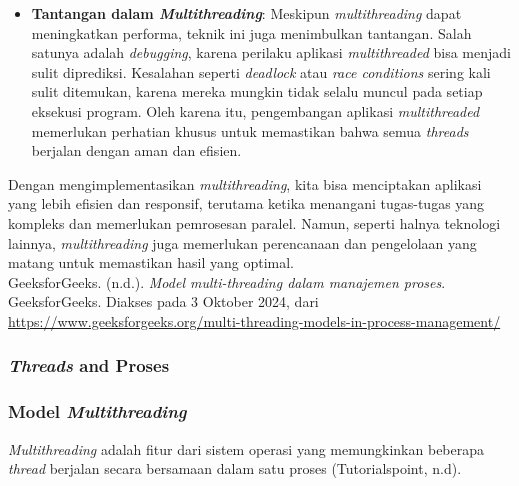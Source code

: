 \documentclass[12pt]{article}
\begin{document}
\begin{itemize}
    \item \textbf{Tantangan dalam \textit{Multithreading}}: Meskipun \textit{multithreading} dapat meningkatkan performa, teknik ini juga menimbulkan tantangan. Salah satunya adalah \textit{debugging}, karena perilaku aplikasi \textit{multithreaded} bisa menjadi sulit diprediksi. Kesalahan seperti \textit{deadlock} atau \textit{race conditions} sering kali sulit ditemukan, karena mereka mungkin tidak selalu muncul pada setiap eksekusi program. Oleh karena itu, pengembangan aplikasi \textit{multithreaded} memerlukan perhatian khusus untuk memastikan bahwa semua \textit{threads} berjalan dengan aman dan efisien.
\end{itemize}

Dengan mengimplementasikan \textit{multithreading}, kita bisa menciptakan aplikasi yang lebih efisien dan responsif, terutama ketika menangani tugas-tugas yang kompleks dan memerlukan pemrosesan paralel. Namun, seperti halnya teknologi lainnya, \textit{multithreading} juga memerlukan perencanaan dan pengelolaan yang matang untuk memastikan hasil yang optimal.\\

\noindent GeeksforGeeks. (n.d.). \textit{Model multi-threading dalam manajemen proses}. GeeksforGeeks. Diakses pada 3 Oktober 2024, dari \url{https://www.geeksforgeeks.org/multi-threading-models-in-process-management/}

\subsubsection{\textit{Threads} and Proses}
\subsubsection{Model \textit{Multithreading}}
\textit{Multithreading} adalah fitur dari sistem operasi yang memungkinkan beberapa \textit{thread} berjalan secara bersamaan dalam satu proses (Tutorialspoint, n.d).\\
\end{document}
